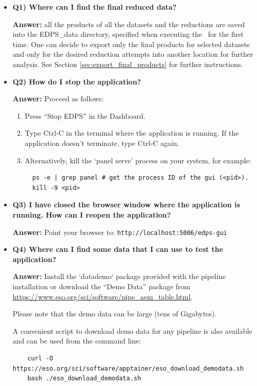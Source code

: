 \begin{itemize}
\item {\bf Q1) Where can I find the final reduced data?}

{\bf Answer:} all the products of all the datasets and the reductions are saved into the EDPS\_data directory, specified when
executing the \edpsgui\ for the first time. One can decide to export only the final products for selected datasets and
only for the desired reduction attempts into another location for further analysis. See Section \ref{sec:export_final_products} for further instructions.


\item {\bf Q2) How do I stop the application?}

{\bf Answer:} Proceed as follows:

\begin{enumerate}
\item Press “Stop EDPS” in the Dashboard.

\item  Type Ctrl-C in the terminal where the application is running. If the
   application doesn’t terminate, type Ctrl-C again.

\item  Alternatively, kill the ‘panel serve’ process on your system, for example:
\begin{verbatim}
  ps -e | grep panel # get the process ID of the gui (<pid>).
  kill -9 <pid>
\end{verbatim}
\end{enumerate}

\item {\bf Q3) I have closed the browser window where the application is running. How can I reopen the application?}

{\bf Answer:} Point your browser to: \verb|http://localhost:5006/edps-gui|

\item {\bf Q4) Where can I find some data that I can use to test the application?}

{\bf Answer:} Install the `datademo` package provided with the pipeline installation or download the “Demo Data” package from 
\href{https://www.eso.org/sci/software/pipe_aem_table.html}{https://www.eso.org/sci/software/pipe\_aem\_table.html}.

Please note that the demo data can be large (tens of Gigabytes).

A convenient script to download demo data for any pipeline is also available and can be used from the command line:
\begin{verbatim}
	curl -O https://eso.org/sci/software/apptainer/eso_download_demodata.sh  
	bash ./eso_download_demodata.sh 
\end{verbatim}


\end{itemize}
